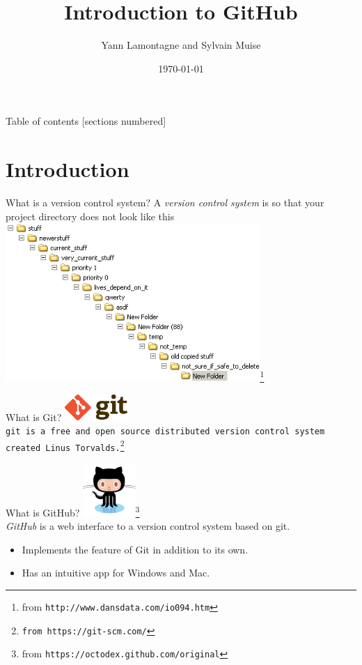 \documentclass[10pt]{beamer}
\title{Introduction to GitHub}
\date{\today}
\author{Yann Lamontagne and Sylvain Muise}
\institute{For PedDay2016 at Dawson College}
\begin{document}
\maketitle

\begin{frame}{Table of contents}
  [sections numbered]
  \tableofcontents[hideallsubsections]
\end{frame}

\section{Introduction}

\begin{frame}{What is a version control system?}
A \emph{version control system} is so that your project directory does not look like this\\
\includegraphics[height=6cm]{images/folders.png}\footnote{from \tt{http://www.dansdata.com/io094.htm}}\\
\end{frame}


\begin{frame}{What is Git?}
\includegraphics[height=1cm]{images/git-logo.png}\\
\tt{git} is a free and open source distributed version control system created Linus Torvalds.\footnote{from \tt{https://git-scm.com/}}
\end{frame}


\begin{frame}{What is GitHub?}
\includegraphics[height=2cm]{images/octocat.png}\footnote{from \tt{https://octodex.github.com/original}}\\
\emph{GitHub} is a web interface to a version control system based on git. 
\begin{itemize}
\item Implements the feature of Git in addition to its own.
\item Has an intuitive app for Windows and Mac.
\end{itemize}

\end{frame}


\end{document}
